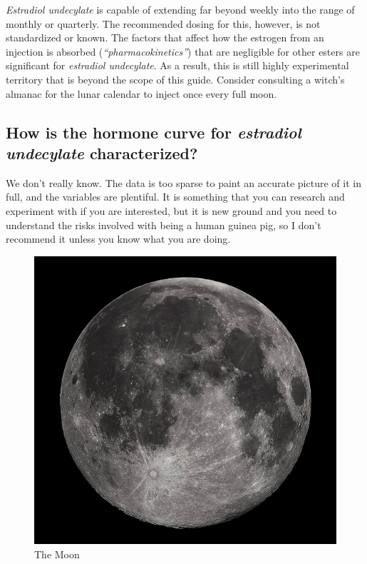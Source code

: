 \documentclass{article}
\begin{document}
\textit{Estradiol undecylate} is capable of extending far beyond weekly into the range of monthly or quarterly. The recommended dosing for this, however, is not standardized or known. The factors that affect how the estrogen from an injection is absorbed (\textit{“pharmacokinetics”}) that are negligible for other esters are significant for \textit{estradiol undecylate}. As a result, this is still highly experimental territory that is beyond the scope of this guide. Consider consulting a witch’s almanac for the lunar calendar to inject once every full moon.

\subsection{How is the hormone curve for \textit{estradiol undecylate} characterized?}

We don’t really know. The data is too sparse to paint an accurate picture of it in full, and the variables are plentiful. It is something that you can research and experiment with if you are interested, but it is new ground and you need to understand the risks involved with being a human guinea pig, so I don’t recommend it unless you know what you are doing.

 \begin{figure}[H]
     \centering
     \includegraphics[width=1\linewidth]{moon.png}
     \caption{The Moon}
     \label{fig:moon}
 \end{figure}
\end{document}
